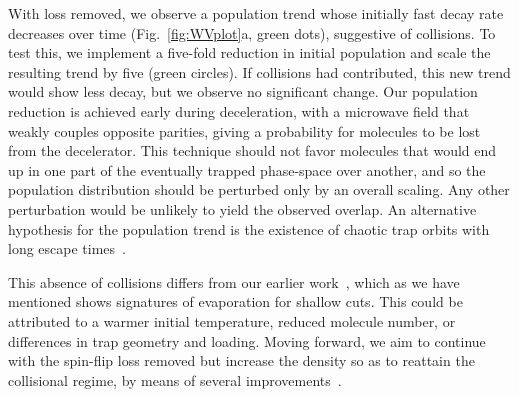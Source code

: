 \documentclass[%
 reprint,
 amsmath,amssymb,
 aps,
prl,
]{revtex4-1}
\newcommand{\cmnt}[1]{\ignorespaces}
\begin{document}
With loss removed, we observe a population trend whose initially fast decay rate decreases over time (Fig.~\ref{fig:WVplot}a, green dots), suggestive of collisions. To test this, we implement a five-fold reduction in initial population and scale the resulting trend by five (green circles). If collisions had contributed, this new trend would show less decay, but we observe no significant change. Our population reduction is achieved early during deceleration, with a microwave field that weakly couples opposite parities, giving a probability for molecules to be lost from the decelerator. This technique should not favor molecules that would end up in one part of the eventually trapped phase-space over another, and so the population distribution should be perturbed only by an overall scaling. Any other perturbation would be unlikely to yield the observed overlap. An alternative hypothesis for the population trend is the existence of chaotic trap orbits with long escape times~\cite{Gonzalez-Ferez2014}.

This absence of collisions differs from our earlier work~\cite{Stuhl2012evap}, which as we have mentioned shows signatures of evaporation for shallow cuts. This could be attributed to a warmer initial temperature, reduced molecule number, or differences in trap geometry and loading. \cmnt{It is also possible that the spin-flip loss is playing a role even for the light evaporation cuts, although it is unclear how this could masquerade as a normalized low field density enhancement.} Moving forward, we aim to continue with the spin-flip loss removed but increase the density so as to reattain the collisional regime, by means of several improvements~\cite{Even2015,Segev2017}.

\end{document}
